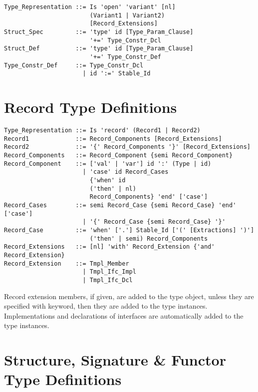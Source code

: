 \syntax\begin{lstlisting}
Type_Representation ::= Is 'open' 'variant' [nl]
                        (Variant1 | Variant2)
                        [Record_Extensions]
Struct_Spec         ::= 'type' id [Type_Param_Clause] 
                        '+=' Type_Constr_Dcl
Struct_Def          ::= 'type' id [Type_Param_Clause] 
                        '+=' Type_Constr_Def
Type_Constr_Def     ::= Type_Constr_Dcl 
                      | id ':=' Stable_Id
\end{lstlisting}






\section{Record Type Definitions}
\label{sec:record-types}

\syntax\begin{lstlisting}
Type_Representation ::= Is 'record' (Record1 | Record2)
Record1             ::= Record_Components [Record_Extensions]
Record2             ::= '{' Record_Components '}' [Record_Extensions]
Record_Components   ::= Record_Component {semi Record_Component}
Record_Component    ::= ['val' | 'var'] id ':' (Type | id)
                      | 'case' id Record_Cases
                        {'when' id 
                        ('then' | nl) 
                        Record_Components} 'end' ['case']
Record_Cases        ::= semi Record_Case {semi Record_Case} 'end' ['case']
                      | '{' Record_Case {semi Record_Case} '}'
Record_Case         ::= 'when' ['.'] Stable_Id ['(' [Extractions] ')']
                        ('then' | semi) Record_Components
Record_Extensions   ::= [nl] 'with' Record_Extension {'and' Record_Extension}
Record_Extension    ::= Tmpl_Member
                      | Tmpl_Ifc_Impl
                      | Tmpl_Ifc_Dcl
\end{lstlisting}

Record extension members, if given, are added to the type object, unless they are specified with  keyword, then they are added to the type instances. Implementations and declarations of interfaces are automatically added to the type instances. 





\section{Structure, Signature \& Functor Type Definitions}
\label{sec:struct-types}

